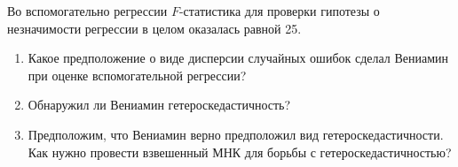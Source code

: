 \begin{enumerate}
Во вспомогательно регрессии $F$-статистика для проверки гипотезы о незначимости регрессии в целом оказалась равной 25. 

\begin{enumerate}
  \item Какое предположение о виде дисперсии случайных ошибок сделал Вениамин при оценке вспомогательной регрессии?
  \item Обнаружил ли Вениамин гетероскедастичность?
  \item Предположим, что Вениамин верно предположил вид гетероскедастичности. 
  Как нужно провести взвешенный МНК для борьбы с гетероскедастичностью?
\end{enumerate}

\end{enumerate}